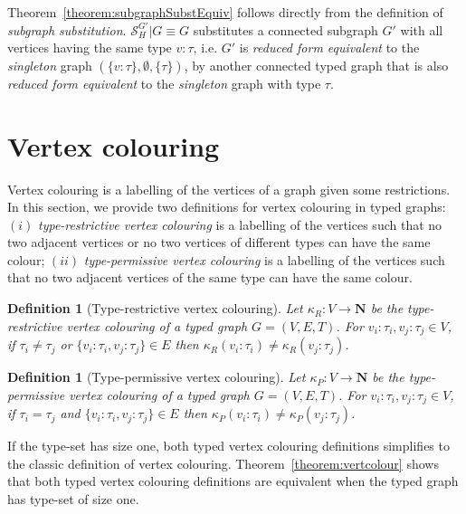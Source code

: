\documentclass[preprint,12pt]{elsarticle}
\theoremstyle{plain}
\newtheorem{definition}[theorem]{Definition}
\newcommand\tyv[2]{#1\!\!:\!\!#2}
\begin{document}
Theorem~\ref{theorem:subgraphSubstEquiv} follows directly from the definition of \textit{subgraph substitution}.
$\mathcal{S}^{G'}_H|G \equiv G$ substitutes a connected subgraph $G'$ with all vertices having the same type $\tyv{v}{\tau}$,
i.e. $G'$
is \textit{reduced form equivalent} to the \textit{singleton} graph $(\{\tyv{v}{\tau}\},\emptyset,\{\tau\})$,
by another connected typed graph that is also \textit{reduced form equivalent} to the \textit{singleton} graph with type
$\tau$.

\section{Vertex colouring}

Vertex colouring is a labelling of the vertices of a
graph given some restrictions.
In this section, we provide two definitions for vertex colouring
in typed graphs: $(i)$ \textit{type-restrictive vertex colouring}
is a labelling of the vertices such that no two adjacent vertices
or no two vertices of different types can have the same colour;
$(ii)$ \textit{type-permissive vertex colouring} 
is a labelling of the vertices such that 
no two adjacent vertices of the same type can have the
same colour.

\begin{definition}[Type-restrictive vertex colouring]
Let $\kappa_R:V\rightarrow \mathbf{N}$ be the
type-restrictive vertex colouring of a typed graph $G = (V,E,T)$.
For $\tyv{v_i}{\tau_i}, \tyv{v_j}{\tau_j}\in V$,
if $\tau_i\neq\tau_j$
or
$\{\tyv{v_i}{\tau_i}, \tyv{v_j}{\tau_j}\}\in E$
then
$\kappa_R(\tyv{v_i}{\tau_i})\neq\kappa_R(\tyv{v_j}{\tau_j})$.
\end{definition}

\begin{definition}[Type-permissive vertex colouring]
Let $\kappa_P:V\rightarrow \mathbf{N}$ be the
type-permissive vertex colouring of a typed graph $G = (V,E,T)$.
For $\tyv{v_i}{\tau_i}, \tyv{v_j}{\tau_j}\in V$,
if $\tau_i=\tau_j$
and
$\{\tyv{v_i}{\tau_i}, \tyv{v_j}{\tau_j}\}\in E$
then
$\kappa_P(\tyv{v_i}{\tau_i})\neq\kappa_P(\tyv{v_j}{\tau_j})$.
\end{definition}

If the type-set has size one, both typed vertex colouring definitions
simplifies to the classic definition of vertex colouring. 
Theorem~\ref{theorem:vertcolour} shows that both typed vertex colouring definitions
are equivalent when the typed graph has type-set of size one.
\end{document}
